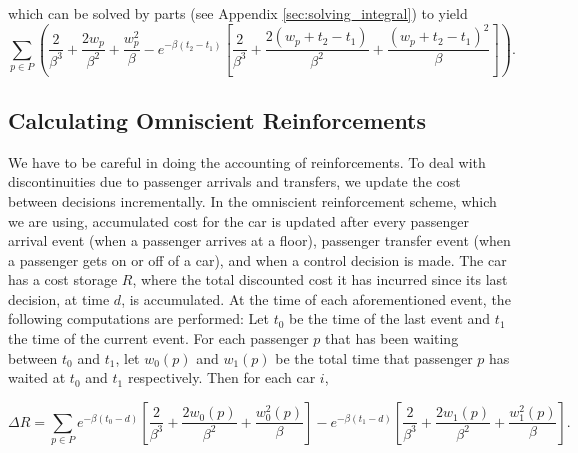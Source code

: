 which can be solved by parts (see Appendix \ref{sec:solving_integral}) to yield
\begin{equation}
    \sum_{p\in P} \left(\frac{2}{\beta^3} + \frac{2w_p}{\beta^2} + \frac{w_p^2}{\beta} - e^{-\beta(t_2 - t_1)} \left[ \frac{2}{\beta^3} + \frac{2(w_p + t_2 - t_1)}{\beta^2} + \frac{(w_p + t_2 - t_1)^2}{\beta} \right]\right). \label{eq:cost_reinforcement_sum}
\end{equation}

\label{sec:omniscient}
\subsection{Calculating Omniscient Reinforcements}
We have to be careful in doing the accounting of reinforcements. To deal with discontinuities due to passenger arrivals and transfers, we update the cost between decisions incrementally. In the omniscient reinforcement scheme, which we are using, accumulated cost for the car is updated after every passenger arrival event (when a passenger arrives at a floor), passenger transfer event (when a passenger gets on or off of a car), and when a control decision is made. The car has a cost storage $R$, where the total discounted cost it has incurred since its last decision, at time $d$, is accumulated. At the time of each aforementioned event, the following computations are performed: Let $t_0$ be the time of the last event and $t_1$ the time of the current event. For each passenger $p$ that has been waiting between $t_0$ and $t_1$, let $w_0(p)$ and $w_1(p)$ be the total time that passenger $p$ has waited at $t_0$ and $t_1$ respectively. Then for each car $i$,

\begin{equation}
   \Delta R = \sum_{p\in P} e^{-\beta (t_0 - d)} \left[\frac{2}{\beta^3} + \frac{2w_0(p)}{\beta^2} + \frac{w_0^2(p)}{\beta}  \right] - e^{-\beta(t_1 - d)} \left[ \frac{2}{\beta^3} + \frac{2w_1(p)}{\beta^2} + \frac{w_1^2(p)}{\beta} \right]. \label{eq:cost_reinforcement_partial}
\end{equation}

